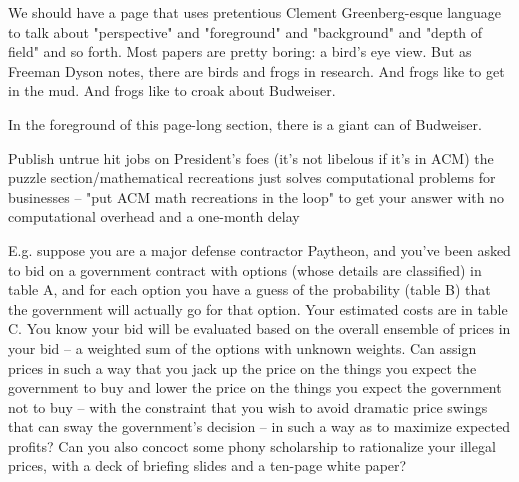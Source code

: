 We should have a page that uses pretentious Clement Greenberg-esque language to talk about "perspective" and "foreground" and "background" and "depth of field" and so forth. Most papers are pretty boring: a bird's eye view. But as Freeman Dyson notes, there are birds and frogs in research. And frogs like to get in the mud. And frogs like to croak about Budweiser.

In the foreground of this page-long section, there is a giant can of Budweiser.

Publish untrue hit jobs on President's foes (it's not libelous if it's in ACM)
the puzzle section/mathematical recreations just solves computational problems for businesses -- "put ACM math recreations in the loop" to get your answer with no computational overhead and a one-month delay

E.g. suppose you are a major defense contractor Paytheon, and you've been asked to bid on a government contract with options (whose details are classified) in table A, and for each option you have a guess of the probability (table B) that the government will actually go for that option. Your estimated costs are in table C. You know your bid will be evaluated based on the overall ensemble of prices in your bid -- a weighted sum of the options with unknown weights. Can assign prices in such a way that you jack up the price on the things you expect the government to buy and lower the price on the things you expect the government not to buy -- with the constraint that you wish to avoid dramatic price swings that can sway the government's decision -- in such a way as to maximize expected profits? Can you also concoct some phony scholarship to rationalize your illegal prices, with a deck of briefing slides and a ten-page white paper?
